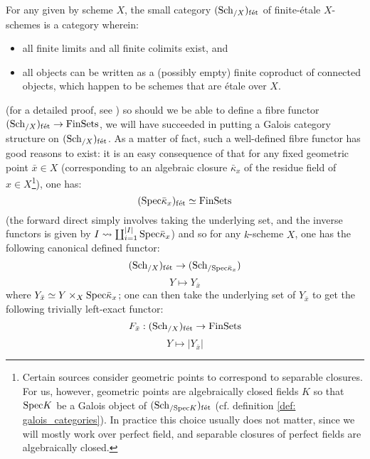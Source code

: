             \begin{remark} \label{remark: finite_etale_schemes}
                For any given by scheme $X$, the small category $(\mathrm{Sch}_{/X})_{\mathrm{f\acute{e}t}}$ of finite-\'etale $X$-schemes is a category wherein:
                    \begin{itemize}
                        \item all finite limits and all finite colimits exist, and
                        \item all objects can be written as a (possibly empty) finite coproduct of connected objects, which happen to be schemes that are \'etale over $X$.  
                    \end{itemize}
                (for a detailed proof, see \cite[\href{https://stacks.math.columbia.edu/tag/0BN9}{Tag 0BN9}]{stacks}) so should we be able to define a fibre functor $(\mathrm{Sch}_{/X})_{\mathrm{f\acute{e}t}} \to \mathrm{Fin}\mathrm{Sets}$, we will have succeeded in putting a Galois category structure on $(\mathrm{Sch}_{/X})_{\mathrm{f\acute{e}t}}$. As a matter of fact, such a well-defined fibre functor has good reasons to exist: it is an easy consequence of \cite[\href{https://stacks.math.columbia.edu/tag/00U3}{Tag 00U3}]{stacks} that for any fixed geometric point $\bar{x} \in X$ (corresponding to an algebraic closure $\bar{\kappa}_x$ of the residue field of $x \in X$\footnote{Certain sources consider geometric points to correspond to separable closures. For us, however, geometric points are algebraically closed fields $K$ so that $\mathrm{Spec} K$ be a Galois object of $(\mathrm{Sch}_{/\mathrm{Spec} K})_{\mathrm{f\acute{e}t}}$ (cf. definition \ref{def: galois_categories}). In practice this choice usually does not matter, since we will mostly work over perfect field, and separable closures of perfect fields are algebraically closed.}), one has:
                    $$(\mathrm{Spec} \bar{\kappa}_x)_{\mathrm{f\acute{e}t}} \simeq \mathrm{Fin}\mathrm{Sets}$$
                (the forward direct simply involves taking the underlying set, and the inverse functors is given by $I \leadsto \coprod_{i = 1}^{|I|} \mathrm{Spec} \bar{\kappa}_x$) and so for any $k$-scheme $X$, one has the following canonical defined functor:
                    $$(\mathrm{Sch}_{/X})_{\mathrm{f\acute{e}t}} \to (\mathrm{Sch}_{/\mathrm{Spec} \bar{\kappa}_x})$$
                    $$Y \mapsto Y_{\bar{x}}$$
                where $Y_{\bar{x}} \cong Y \x_X \Spec \bar{\kappa}_x$; one can then take the underlying set of $Y_{\bar{x}}$ to get the following trivially left-exact functor:
                    $$F_{\bar{x}}: (\mathrm{Sch}_{/X})_{\mathrm{f\acute{e}t}} \to \mathrm{Fin}\mathrm{Sets}$$
                    $$Y \mapsto |Y_{\bar{x}}|$$

\end{remark}
